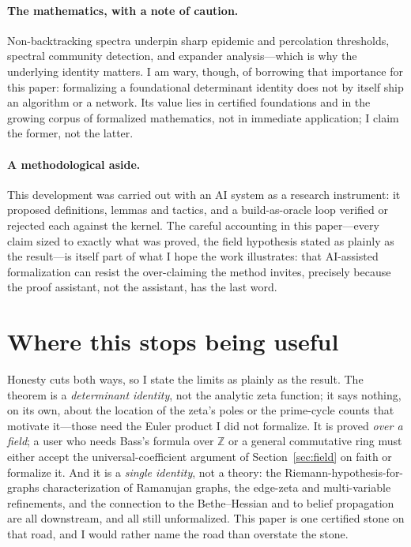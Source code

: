 \documentclass[11pt]{article}
\newcommand{\Z}{\mathbb{Z}}
\begin{document}
\paragraph{The mathematics, with a note of caution.}
Non-backtracking spectra underpin sharp epidemic and percolation thresholds, spectral community
detection, and expander analysis---which is why the underlying identity matters. I am wary, though,
of borrowing that importance for this paper: formalizing a foundational determinant identity does
not by itself ship an algorithm or a network. Its value lies in certified foundations and in the
growing corpus of formalized mathematics, not in immediate application; I claim the former, not the
latter.

\paragraph{A methodological aside.}
This development was carried out with an AI system as a research instrument: it proposed definitions,
lemmas and tactics, and a build-as-oracle loop verified or rejected each against the kernel. The
careful accounting in this paper---every claim sized to exactly what was proved, the field
hypothesis stated as plainly as the result---is itself part of what I hope the work illustrates:
that AI-assisted formalization can resist the over-claiming the method invites, precisely because
the proof assistant, not the assistant, has the last word.

\section{Where this stops being useful}
\label{sec:context}

Honesty cuts both ways, so I state the limits as plainly as the result. The theorem is a
\emph{determinant identity}, not the analytic zeta function; it says nothing, on its own, about the
location of the zeta's poles or the prime-cycle counts that motivate it---those need the Euler
product I did not formalize. It is proved \emph{over a field}; a user who needs Bass's formula over
$\Z$ or a general commutative ring must either accept the universal-coefficient argument of
Section~\ref{sec:field} on faith or formalize it. And it is a \emph{single identity}, not a theory:
the Riemann-hypothesis-for-graphs characterization of Ramanujan graphs, the edge-zeta and
multi-variable refinements, and the connection to the Bethe--Hessian and to belief propagation are
all downstream, and all still unformalized. This paper is one certified stone on that road, and I
would rather name the road than overstate the stone.
\end{document}
